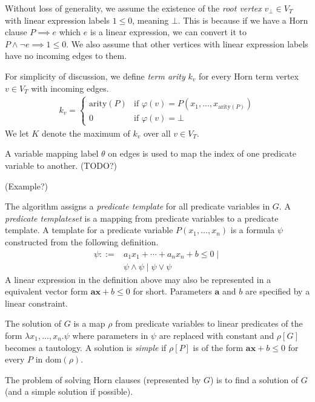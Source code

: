 \documentclass[a4paper,12pt]{article}
\begin{document}
Without loss of generality, we assume the existence of the \emph{root
  vertex} $v_\bot \in V_T$ with linear expression labels $1 \leq 0$,
meaning $\bot$.  This is because if we have a Horn clause $P \implies
e$ which $e$ is a linear expression, we can convert it to $P \wedge
\neg e \implies 1 \leq 0$.  We also assume that other vertices with
linear expression labels have no incoming edges to them.

For simplicity of discussion, we define \emph{term arity} $k_v$ for
every Horn term vertex $v \in V_T$ with incoming edges.
\begin{align*}
k_v =
\begin{cases}
\mathrm{arity}(P) & \mbox{if } \varphi(v) = P(x_1,...,x_{\mathrm{arity}(P)}) \\
0 & \mbox{if } \varphi(v) = \bot
\end{cases}
\end{align*}
We let $K$ denote the maximum of $k_v$ over all $v \in V_T$.

A variable mapping label $\theta$ on edges is used to map the index of
one predicate variable to another. (TODO?)

(Example?)

The algorithm assigns a \emph{predicate template} for all predicate
variables in $G$. A \emph{predicate templateset} is a mapping from
predicate variables to a predicate template.  A template for a
predicate variable $P(x_1, \ldots, x_n)$ is a formula $\psi$
constructed from the following definition.
\begin{align*}
\psi ::= & a_1 x_1 + \cdots + a_n x_n + b \leq 0 \mid \\
& \psi \wedge \psi \mid \psi \vee \psi
\end{align*}
A linear expression in the definition above may also be represented in
a equivalent vector form $\mathbf{a} \mathbf{x} + b \leq 0$ for short.
Parameters $\mathbf{a}$ and $b$ are specified by a linear constraint.

The solution of $G$ is a map $\rho$ from predicate variables to linear
predicates of the form $\lambda x_1, \ldots ,x_n. \psi$ where
parameters in $\psi$ are replaced with constant and $\rho[G]$ becomes
a tautology.  A solution is \textit{simple} if $\rho[P]$ is of the
form $\mathbf{a} \mathbf{x} + b \leq 0$ for every $P$ in
$\mathrm{dom}(\rho)$.

The problem of solving Horn clauses (represented by $G$) is to find a
solution of $G$ (and a simple solution if possible).
\end{document}
